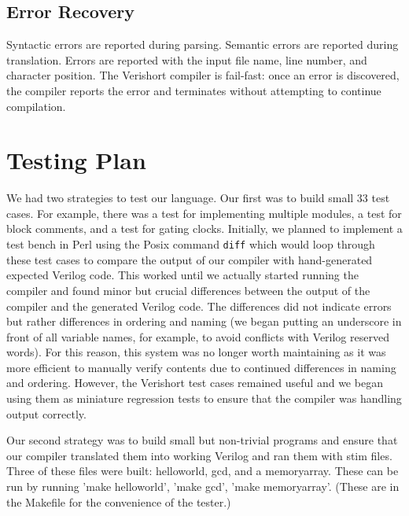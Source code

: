 \documentclass[letterpaper,11pt]{article}
\begin{document}
    \subsection{Error Recovery}
	Syntactic errors are reported during parsing.  Semantic errors are reported during translation.  Errors are reported with the input file name, line number, and character position.  The Verishort compiler is fail-fast: once an error is discovered, the compiler reports the error and terminates without attempting to continue compilation.
\section{Testing Plan}
We had two strategies to test our language.  Our first was to build small 33 test cases.  For example, there was a test for implementing multiple modules, a test for block comments, and a test for gating clocks.  Initially, we planned to implement a test bench in Perl using the Posix command \texttt{diff} which would loop through these test cases to compare the output of our compiler with hand-generated expected Verilog code.  This worked until we actually started running the compiler and found minor but crucial differences between the output of the compiler and the generated Verilog code.  The differences did not indicate errors but rather differences in ordering and naming (we began putting an underscore in front of all variable names, for example, to avoid conflicts with Verilog reserved words).  For this reason,  this system was no longer worth maintaining as it was more efficient to manually verify contents due to continued differences in naming and ordering.  However, the Verishort test cases remained useful and we began using them as miniature regression tests to ensure that the compiler was handling output correctly.

Our second strategy was to build small but non-trivial programs and ensure that our compiler translated them into working Verilog and ran them with stim files.  Three of these files were built: helloworld, gcd, and a memoryarray.  These can be run by running 'make helloworld', 'make gcd', 'make memoryarray'.  (These are in the Makefile for the convenience of the tester.)
    
\end{document}
